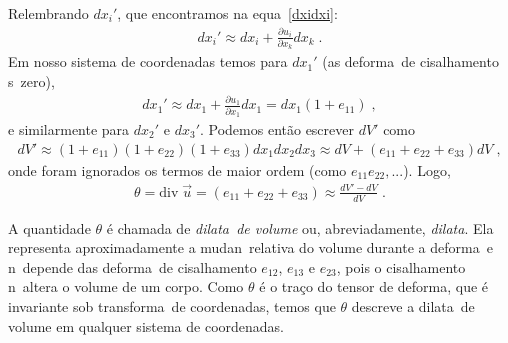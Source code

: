 Relembrando $dx_i'$, que encontramos na
equa\cao\ \ref{dxidxi}:
\begin{eqnarray}
dx_i' \approx dx_i + \frac{\partial u_i}{\partial x_k} dx_k \; .
\end{eqnarray}
Em nosso sistema de coordenadas temos para $dx_1'$
(as deforma\coes\ de cisalhamento s\ao\ zero),
\begin{eqnarray}
dx_1' \approx dx_1 + \frac{\partial u_1}{\partial x_1} dx_1
= dx_1(1+e_{11}) \;,
\end{eqnarray}
e similarmente para $dx_2'$ e $dx_3'$. Podemos ent\~ao escrever $dV'$ como
\begin{eqnarray}
dV' \approx (1+e_{11})(1+e_{22})(1+e_{33})dx_1 dx_2 dx_3
\approx dV + (e_{11} + e_{22} + e_{33}) dV \; ,
\end{eqnarray}
onde foram ignorados os termos de maior ordem (como
$e_{11}e_{22}, ...$). Logo,
\begin{eqnarray}
\theta = \mbox{div}\; \vec{u} = (e_{11} + e_{22} + e_{33})
\approx \frac{dV'-dV}{dV} \; .
\end{eqnarray}

A quantidade $\theta$ \'e chamada de {\it dilata\cao\ de
volume} ou, abreviadamente, {\it dilata\cao}. Ela representa
aproximadamente a mudan\ca\ relativa do volume durante a
deforma\cao\ e n\ao\ depende das deforma\coes\ de cisalhamento
$e_{12}$, $e_{13}$ e $e_{23}$, pois o cisalhamento n\ao\ altera o
volume de um corpo. Como $\theta$ \'e o tra\c co do tensor de
deforma\cao, que \'e invariante sob transforma\cao\ de
coordenadas, temos que $\theta$ descreve a dilata\cao\ 
de volume em qualquer sistema de coordenadas. %



